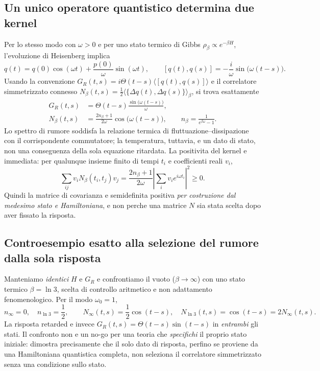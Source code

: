 \documentclass[11pt,a4paper]{article}
\begin{document}
\subsection{Un unico operatore quantistico determina due kernel}
Per lo stesso modo con $\omega>0$ e per uno stato termico di Gibbs $\rho_\beta\propto e^{-\beta H}$, l'evoluzione di Heisenberg implica
\begin{equation}
 q(t)=q(0)\cos(\omega t)+\frac{p(0)}{\omega}\sin(\omega t),\qquad
 [q(t),q(s)]=-\frac{i}{\omega}\sin\bigl(\omega(t-s)\bigr).
 \label{eq:r12au_comm}
\end{equation}
Usando la convenzione $G_R(t,s)=i\Theta(t-s)\langle[q(t),q(s)]\rangle$ e il correlatore simmetrizzato connesso $N_\beta(t,s)=\frac12\langle\{\Delta q(t),\Delta q(s)\}\rangle_\beta$, si trova esattamente
\begin{align}
 G_R(t,s)&=\Theta(t-s)\frac{\sin\bigl(\omega(t-s)\bigr)}{\omega},
 \label{eq:r12au_retarded}\\
 N_\beta(t,s)&=\frac{2n_\beta+1}{2\omega}\cos\bigl(\omega(t-s)\bigr),
 \qquad n_\beta=\frac{1}{e^{\beta\omega}-1}.
 \label{eq:r12au_noise}
\end{align}
Lo spettro di rumore soddisfa la relazione termica di fluttuazione--dissipazione con il corrispondente commutatore; la temperatura, tuttavia, e un dato di stato, non una conseguenza della sola equazione ritardata. La positivita del kernel e immediata: per qualunque insieme finito di tempi $t_i$ e coefficienti reali $v_i$,
\begin{equation}
 \sum_{ij}v_i N_\beta(t_i,t_j)v_j
 =\frac{2n_\beta+1}{2\omega}\left|\sum_i v_i e^{i\omega t_i}\right|^2\geq0.
 \label{eq:r12au_psd}
\end{equation}
Quindi la matrice di covarianza e semidefinita positiva \emph{per costruzione dal medesimo stato e Hamiltoniana}, e non perche una matrice $N$ sia stata scelta dopo aver fissato la risposta.

\subsection{Controesempio esatto alla selezione del rumore dalla sola risposta}
Manteniamo \emph{identici} $H$ e $G_R$ e confrontiamo il vuoto ($\beta\to\infty$) con uno stato termico $\beta=\ln3$, scelta di controllo aritmetico e non adattamento fenomenologico. Per il modo $\omega_0=1$,
\begin{equation}
 n_{\infty}=0,\quad n_{\ln3}=\frac12,\qquad
 N_{\infty}(t,s)=\frac12\cos(t-s),\quad
 N_{\ln3}(t,s)=\cos(t-s)=2N_{\infty}(t,s).
 \label{eq:r12au_double}
\end{equation}
La risposta retarded e invece $G_R(t,s)=\Theta(t-s)\sin(t-s)$ in \emph{entrambi} gli stati. Il confronto non e un no-go per una teoria che \emph{specifichi} il proprio stato iniziale: dimostra precisamente che il solo dato di risposta, perfino se proviene da una Hamiltoniana quantistica completa, non seleziona il correlatore simmetrizzato senza una condizione sullo stato.
\end{document}

